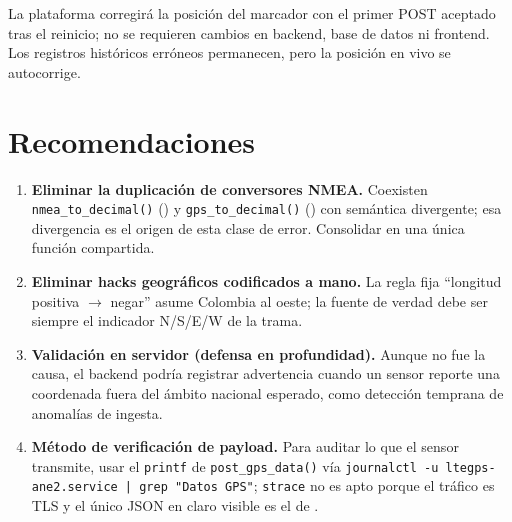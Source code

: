 \documentclass[11pt,a4paper]{report}
\begin{document}
La plataforma corregirá la posición del marcador con el primer POST aceptado tras el
reinicio; no se requieren cambios en backend, base de datos ni frontend. Los registros
históricos erróneos permanecen, pero la posición en vivo se autocorrige.

\chapter{Recomendaciones}

\begin{enumerate}
\item \textbf{Eliminar la duplicación de conversores NMEA.} Coexisten
\lstinline|nmea_to_decimal()| () y \lstinline|gps_to_decimal()|
() con semántica divergente; esa divergencia es el origen de esta clase de
error. Consolidar en una única función compartida.
\item \textbf{Eliminar hacks geográficos codificados a mano.} La regla fija ``longitud
positiva $\rightarrow$ negar'' asume Colombia al oeste; la fuente de verdad debe ser
siempre el indicador N/S/E/W de la trama.
\item \textbf{Validación en servidor (defensa en profundidad).} Aunque no fue la causa,
el backend podría registrar advertencia cuando un sensor reporte una coordenada fuera del
ámbito nacional esperado, como detección temprana de anomalías de ingesta.
\item \textbf{Método de verificación de payload.} Para auditar lo que el sensor transmite,
usar el \lstinline|printf| de \lstinline|post_gps_data()| vía
\texttt{journalctl -u ltegps-ane2.service | grep "Datos GPS"}; \texttt{strace} no es
apto porque el tráfico es TLS y el único JSON en claro visible es el de
.
\end{enumerate}
\end{document}
